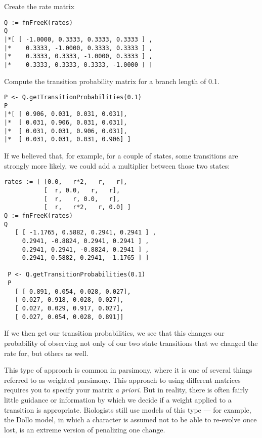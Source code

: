 Create the rate matrix
{\tt \begin{snugshade*}
\begin{lstlisting}
Q := fnFreeK(rates)
Q
|*[ [ -1.0000, 0.3333, 0.3333, 0.3333 ] ,
|*    0.3333, -1.0000, 0.3333, 0.3333 ] ,
|*    0.3333, 0.3333, -1.0000, 0.3333 ] ,
|*    0.3333, 0.3333, 0.3333, -1.0000 ] ]
\end{lstlisting}
\end{snugshade*}}

Compute the transition probability matrix for a branch length of 0.1.

{\tt \begin{snugshade*}
\begin{lstlisting}
P <- Q.getTransitionProbabilities(0.1)
P
|*[ [ 0.906, 0.031, 0.031, 0.031],
|*  [ 0.031, 0.906, 0.031, 0.031],
|*  [ 0.031, 0.031, 0.906, 0.031],
|*  [ 0.031, 0.031, 0.031, 0.906] ]
\end{lstlisting}
\end{snugshade*}}

If we believed that, for example, for a couple of states, some transitions are strongly more likely, we could add a multiplier between those two states:

{\tt \begin{snugshade*}
\begin{lstlisting}
rates := [ [0.0,   r*2,   r,   r],
           [  r, 0.0,   r,   r],
           [  r,   r, 0.0,   r],
           [  r,   r*2,   r, 0.0] ]
Q := fnFreeK(rates)
Q
   [ [ -1.1765, 0.5882, 0.2941, 0.2941 ] ,
     0.2941, -0.8824, 0.2941, 0.2941 ] ,
     0.2941, 0.2941, -0.8824, 0.2941 ] ,
     0.2941, 0.5882, 0.2941, -1.1765 ] ]

 P <- Q.getTransitionProbabilities(0.1)
 P
   [ [ 0.891, 0.054, 0.028, 0.027], 
   [ 0.027, 0.918, 0.028, 0.027], 
   [ 0.027, 0.029, 0.917, 0.027], 
   [ 0.027, 0.054, 0.028, 0.891]]
\end{lstlisting}
\end{snugshade*}}

If we then get our transition probabilities, we see that this changes our probability of observing  not only of our two state transitions that we changed the rate for, but others as well.

This type of approach is common in parsimony, where it is one of several things referred to as weighted parsimony. 
This approach to using different matrices requires you to specify your matrix \textit{a priori}.
But in reality, there is often fairly little guidance or information by which we decide if a weight applied to a transition is appropriate.
Biologists still use models of this type --- for example, the Dollo model, in which a character is assumed not to be able to re-evolve once lost, is an extreme version of penalizing one change.

